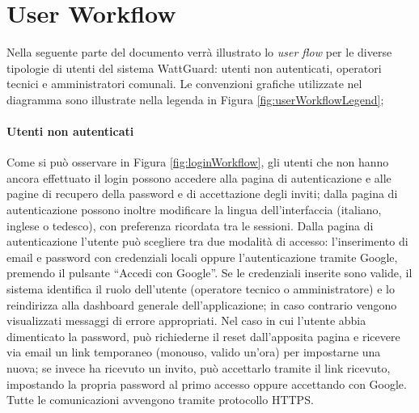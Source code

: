 \section{User Workflow}\label{chap:userWorkflow}


Nella seguente parte del documento verrà illustrato lo \textit{user flow} per le diverse tipologie di utenti del sistema WattGuard: utenti non autenticati, operatori tecnici e amministratori comunali. Le convenzioni grafiche utilizzate nel diagramma sono illustrate nella legenda in Figura \ref{fig:userWorkflowLegend}; 

\paragraph{Utenti non autenticati}
Come si può osservare in Figura \ref{fig:loginWorkflow}, gli utenti che non hanno ancora effettuato il login possono accedere alla pagina di autenticazione e alle pagine di recupero della password e di accettazione degli inviti; dalla pagina di autenticazione possono inoltre modificare la lingua dell'interfaccia (italiano, inglese o tedesco), con preferenza ricordata tra le sessioni. Dalla pagina di autenticazione l'utente può scegliere tra due modalità di accesso: l'inserimento di email e password con credenziali locali oppure l'autenticazione tramite Google, premendo il pulsante ``Accedi con Google''. Se le credenziali inserite sono valide, il sistema identifica il ruolo dell'utente (operatore tecnico o amministratore) e lo reindirizza alla dashboard generale dell'applicazione; in caso contrario vengono visualizzati messaggi di errore appropriati. Nel caso in cui l'utente abbia dimenticato la password, può richiederne il reset dall'apposita pagina e ricevere via email un link temporaneo (monouso, valido un'ora) per impostarne una nuova; se invece ha ricevuto un invito, può accettarlo tramite il link ricevuto, impostando la propria password al primo accesso oppure accettando con Google. Tutte le comunicazioni avvengono tramite protocollo HTTPS.


